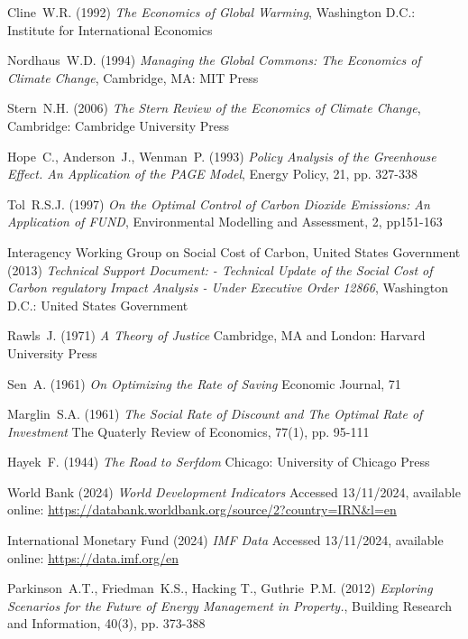 \documentclass[11pt, oneside]{article}   	%
\begin{document}
\begin{thebibliography}{99}
 Cline~W.R. (1992)
\emph{The Economics of Global Warming},
Washington D.C.: Institute for International Economics
		
 Nordhaus~W.D. (1994)
\emph{Managing the Global Commons: The Economics of Climate Change},
Cambridge, MA: MIT Press
	
 Stern~N.H. (2006)
\emph{The Stern Review of the Economics of Climate Change},
Cambridge: Cambridge University Press
		
 Hope~C., Anderson~J., Wenman~P. (1993)
\emph{Policy Analysis of the Greenhouse Effect. An Application of the PAGE Model},
Energy Policy, 21, pp. 327-338
		
 Tol~R.S.J. (1997)
\emph{On the Optimal Control of Carbon Dioxide Emissions: An Application of FUND},
Environmental Modelling and Assessment, 2, pp151-163

 Interagency Working Group on Social Cost of Carbon, United States Government (2013)
\emph{Technical Support Document: - Technical Update of the Social Cost of Carbon regulatory Impact Analysis - Under Executive Order 12866},
Washington D.C.: United States Government

 Rawls~J. (1971)
\emph{A Theory of Justice}
Cambridge, MA and London: Harvard University Press

 Sen~A. (1961)
\emph{On Optimizing the Rate of Saving}
Economic Journal, 71
		
 Marglin~S.A. (1961)
\emph{The Social Rate of Discount and The Optimal Rate of Investment}
The Quaterly Review of Economics, 77(1), pp. 95-111

 Hayek~F. (1944)
\emph{The Road to Serfdom}
Chicago: University of Chicago Press

 World Bank (2024)
\emph{World Development Indicators}
Accessed 13/11/2024, available online: 
\url{https://databank.worldbank.org/source/2?country=IRN&l=en}

 International Monetary Fund (2024)
\emph{IMF Data}
Accessed 13/11/2024, available online: 
\url{https://data.imf.org/en}

 Parkinson~A.T., Friedman~K.S., Hacking T., Guthrie~P.M. (2012)
\emph{Exploring Scenarios for the Future of Energy Management in Property.},
Building Research and Information, 40(3), pp. 373-388
	
\end{thebibliography}
\end{document}
